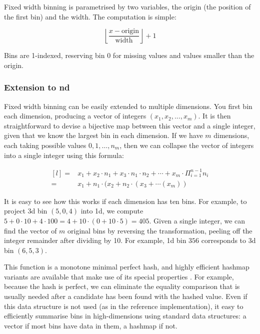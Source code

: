 \documentclass[journal]{vgtc}                %
\begin{document}
Fixed width binning is parametrised by two variables, the origin (the position of the first bin) and the width. The computation is simple:

\begin{equation}
  \label{eq:fixed-width}
  \left \lfloor \frac{x - \text{origin}}{\text{width}} \right \rfloor + 1
\end{equation}

Bins are 1-indexed, reserving bin 0 for missing values and values smaller than the origin.

\subsubsection{Extension to nd}

Fixed width binning can be easily extended to multiple dimensions. You first bin each dimension, producing a vector of integers $(x_1, x_2, ..., x_m)$. It is then straightforward to devise a bijective map between this vector and a single integer, given that we know the largest bin in each dimension. If we have $m$ dimensions, each taking possible values $0, 1, \ldots, n_m$, then we can collapse the vector of integers into a single integer using this formula:

\begin{equation}
  \label{eq:nd-bins}
  \begin{matrix*}[l]
   = & x_1 + x_2 \cdot n_1 + x_3 \cdot n_1 \cdot n_2 + \cdots + x_m \cdot \Pi^{n-1}_{i = 1} n_i \\
   = & x_1 + n_1 \cdot (x_2 + n_2 \cdot (x_3 + \cdots(x_m))
  \end{matrix*}
\end{equation}

It is easy to see how this works if each dimension has ten bins. For example, to project 3d bin $(5, 0, 4)$ into 1d, we compute $5 + 0 \cdot 10 + 4 \cdot 100 = 4 + 10 \cdot (0 + 10 \cdot 5) = 405$. Given a single integer, we can find the vector of $m$ original bins by reversing the transformation, peeling off the integer remainder after dividing by 10. For example, 1d bin $356$ corresponds to 3d bin $(6, 5, 3)$.

This function is a monotone minimal perfect hash, and highly efficient hashmap variants are available that make use of its special properties \citep{belazzougui:2009}. For example, because the hash is perfect, we can eliminate the equality comparison that is usually needed after a candidate has been found with the hashed value. Even if this data structure is not used (as in the reference implementation), it easy to efficiently summarise bins in high-dimensions using standard data structures: a vector if most bins have data in them, a hashmap if not.
\end{document}
